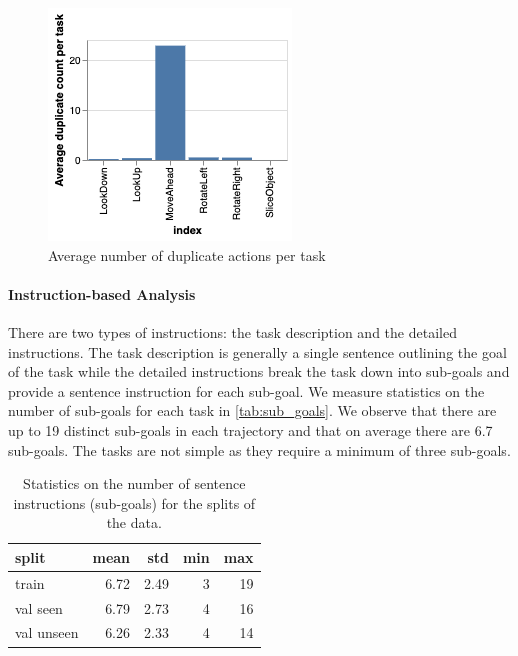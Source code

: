 \documentclass[11pt,a4paper]{article}
\begin{document}
\begin{figure}
    \centering
    \includegraphics[width=\linewidth]{Reports/1-Task-Definition-and-Data/duplicate_distrib.png}
    \caption{Average number of duplicate actions per task}
    \label{fig:duplicate_dist}
\end{figure}


\paragraph{Instruction-based Analysis}
There are two types of instructions: the task description and the detailed instructions. The task description is generally a single sentence outlining the goal of the task while the detailed instructions break the task down into sub-goals and provide a sentence instruction for each sub-goal. We measure statistics on the number of sub-goals for each task in \autoref{tab:sub_goals}. We observe that there are up to 19 distinct sub-goals in each trajectory and that on average there are 6.7 sub-goals. The tasks are not simple as they require a minimum of three sub-goals.

\begin{table}[]
    \centering
\begin{tabular}{lrrrr}
\toprule
     split &  mean &  std &  min &  max \\
\midrule
     train &  6.72 & 2.49 &    3 &   19 \\
  val seen &  6.79 & 2.73 &    4 &   16 \\
val unseen &  6.26 & 2.33 &    4 &   14 \\
\bottomrule
\end{tabular}
    \caption{Statistics on the number of sentence instructions (sub-goals) for the splits of the data.}
    \label{tab:sub_goals}
\end{table}
\end{document}
